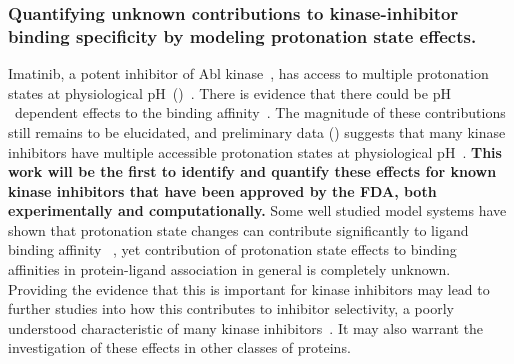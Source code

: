 \documentclass[10pt,final]{article}
\newcommand{\pH}{p$\mathrm{H}$\ }
\begin{document}
\subsubsection*{Quantifying unknown contributions to kinase-inhibitor binding specificity by modeling protonation state effects.}
Imatinib, a potent inhibitor of Abl kinase~\autocite{Druker2001a}, has access to multiple protonation states at physiological \pH ()~\autocite{Szakacs2005a}.
%
There is evidence that there could be \pH dependent effects to the binding affinity~\autocite{Seeliger2007a,Lin2013a}.
%
The magnitude of these contributions still remains to be elucidated, and preliminary data () suggests that many kinase inhibitors have multiple accessible protonation states at physiological \pH.
%
\textbf{This work will be the first to identify and quantify these effects for known kinase inhibitors that have been approved by the FDA, both experimentally and computationally.}
%
Some well studied model systems have shown that protonation state changes can contribute significantly to ligand binding affinity ~\autocite{Dullweber2001a,Aleksandrov2007a,Czodrowski2007a,Steuber2007a,Czodrowski2007b}, yet contribution of protonation state effects to binding affinities in protein-ligand association in general is completely unknown. 
%
Providing the evidence that this is important for kinase inhibitors may lead to further studies into how this contributes to inhibitor selectivity, a poorly understood characteristic of many kinase inhibitors~\autocite{Karaman2008a}.
%
It may also warrant the investigation of these effects in other classes of proteins.
\end{document}
